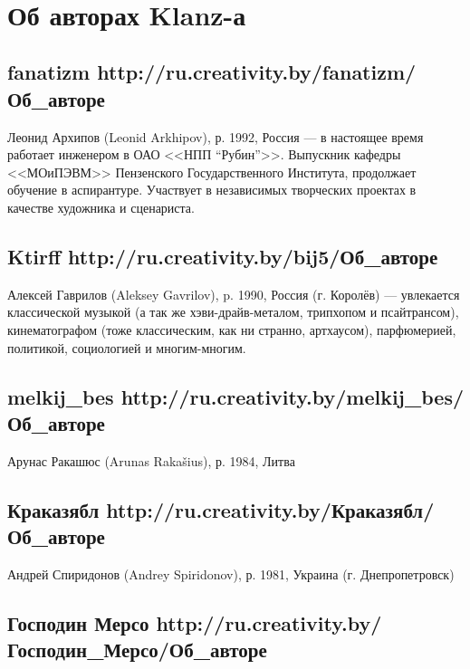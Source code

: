 \newpage
\thispagestyle{empty}
~\\
\newpage
\thispagestyle{empty}
\section*{Об авторах Klanz-а} 

\subsection*{fanatizm \hfill  
\tiny{http://ru.creativity.by/fanatizm/Об\_авторе}}
\noindent Леонид Архипов (Leonid Arkhipov), р. 1992, Россия --- в настоящее время работает инженером в 
ОАО <<НПП ``Рубин''>>. Выпускник кафедры <<МОиПЭВМ>> Пензенского 
Государственного Института, продолжает обучение в аспирантуре. Участвует в 
независимых творческих проектах в качестве художника и сценариста.

\subsection*{Ktirff \hfill  
\tiny{http://ru.creativity.by/bij5/Об\_авторе}}
\noindent Алексей Гаврилов (Aleksey Gavrilov), p. 1990, Россия (г. Королёв) --- увлекается 
классической музыкой (а так же хэви-драйв-металом, трипхопом и псайтрансом), 
кинематографом (тоже классическим, как ни странно, артхаусом), парфюмерией, 
политикой, социологией и многим-многим.

\subsection*{melkij\_bes \hfill  
\tiny{http://ru.creativity.by/melkij\_bes/Об\_авторе}}
\noindent Арунас Ракашюс (Arunas Rakašius), р. 1984, Литва

\subsection*{Краказябл \hfill  
\tiny{http://ru.creativity.by/Краказябл/Об\_авторе}}
\noindent Андрей Спиридонов (Andrey Spiridonov), р. 1981, Украина (г. Днепропетровск)

\subsection*{Господин Мерсо \hfill  
\tiny{http://ru.creativity.by/Господин\_Мерсо/Об\_авторе}}

